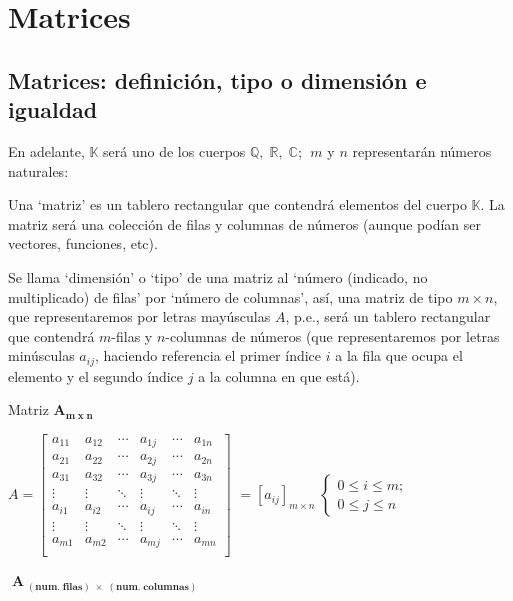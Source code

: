 \chapter{Matrices}	

\section[Matrices: definición, tipo o dimensión e igualdad]{Matrices: definición, tipo o dimensión e igualdad} 

En adelante, $\mathbb K$ será uno de los cuerpos $\mathbb Q, \; \mathbb R, \; \mathbb C$;  $\; m$ y $n$ representarán números naturales:

\begin{defi} Una `matriz' es un tablero rectangular que contendrá elementos del cuerpo $\mathbb K$. La matriz será una colección de filas y columnas de números (aunque podían ser vectores, funciones, etc). 	
\end{defi}
\begin{defi}
Se llama `dimensión' o `tipo' de una matriz	al `número (indicado, no multiplicado)  de filas' por `número de columnas', así, una matriz de tipo $m\times n$, que representaremos por letras mayúsculas $A$, p.e., será un tablero rectangular que contendrá $m$-filas y $n$-columnas de números (que representaremos por letras minúsculas $a_{ij}$, haciendo referencia el primer índice $i$ a la fila que ocupa el elemento y el segundo índice $j$ a la columna en que está).

\begin{myblock}{Matriz $\boldsymbol{A_{m\; x \; n}}$}

$A=\left[
\begin{matrix}
a_{11} & a_{12} & \cdots & a_{1j} & \cdots & a_{1n} \\
a_{21} & a_{22} & \cdots & a_{2j} & \cdots & a_{2n} \\
a_{31} & a_{32} & \cdots & a_{3j} & \cdots & a_{3n} \\
\vdots & \vdots & \ddots & \vdots & \ddots & \vdots \\
a_{i1} & a_{i2} & \cdots & \boxed{a_{ij}} & \cdots & a_{in} \\
\vdots & \vdots & \ddots & \vdots & \ddots & \vdots \\
a_{m1} & a_{m2} & \cdots & a_{mj} & \cdots & a_{mn} \\
\end{matrix}
\right]$
\footnotesize{$= [a_{ij}]_{m \times n} \; \begin{cases}0\le i \le m; \\ 0\le j \le n\end{cases}$}

\vspace{3mm}
\centerline{$\boxed{\; \boldsymbol{A_{\;  (num. \; filas)\; \times \; (num. \; columnas) }}\; }$}

\end{myblock}

\end{defi}
 
